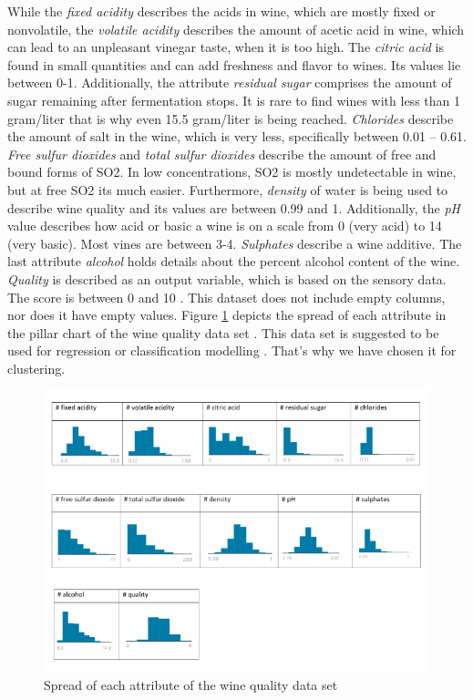 While the \textit {fixed acidity} describes the acids in wine, which are mostly fixed or nonvolatile, the \textit {volatile acidity} describes the amount of acetic acid in wine, which can lead to an unpleasant vinegar taste, when it is too high.  The \textit {citric acid} is found in small quantities and can add freshness and flavor to wines. Its values lie between 0-1. \newline
Additionally, the attribute \textit{residual sugar} comprises the amount of sugar remaining after fermentation stops. It is rare to find wines with less than 1 gram/liter that is why even 15.5 gram/liter is being reached. \newline
\textit {Chlorides} describe the amount of salt in the wine, which is very less, specifically between 0.01 – 0.61. \newline
\textit {Free sulfur dioxides} and \textit {total sulfur dioxides} describe the amount of free and bound forms of SO2. In low concentrations, SO2 is mostly undetectable in wine, but at free SO2 its much easier.
Furthermore, \textit {density} of water is being used to describe wine quality and its values are between 
0.99 and 1. \newline
Additionally, the \textit {pH} value describes how acid or basic a wine is on a scale from 0 (very acid) to 14 (very basic). Most vines are between 3-4. \textit {Sulphates} describe a wine additive.
The last attribute \textit {alcohol} holds details about the percent alcohol content of the wine. 
\textit {Quality} is described as an output variable, which is based on the sensory data. The score is between 0 and 10 \cite{kaggle-redwine}.\newline
This dataset does not include empty columns, nor does it have empty values.
Figure \ref{fig:wine_stats} depicts the spread of each attribute in the pillar chart of the wine quality data set \cite{kaggle-redwine}. This data set is suggested to be used for regression or classification modelling \cite{kaggle-redwine}.
That’s why we have chosen it for clustering. \newline

\begin{figure}[H]
%
\centering
\includegraphics[width=1\textwidth]{images/wine_table.png}
\caption{Spread of each attribute of the wine quality data set}
\label{fig:wine_stats}
\end{figure}